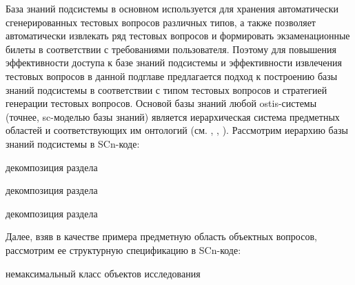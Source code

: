База знаний подсистемы в основном используется для хранения автоматически сгенерированных тестовых вопросов различных типов, а также позволяет автоматически извлекать ряд тестовых вопросов и формировать экзаменационные билеты в соответствии с требованиями пользователя. Поэтому для повышения эффективности доступа к базе знаний подсистемы и эффективности извлечения тестовых вопросов в данной подглаве предлагается подход к построению базы знаний подсистемы в соответствии с типом тестовых вопросов и стратегией генерации тестовых вопросов. Основой базы знаний любой ostis-системы (точнее, sc-моделью базы знаний) является иерархическая система предметных областей и соответствующих им онтологий (см. , , ). Рассмотрим иерархию базы знаний подсистемы в SCn-коде:
\begin{SCn}

\begin{scnreltoset}{декомпозиция раздела}
	
	
	\begin{scnreltoset}{декомпозиция раздела}
	\end{scnreltoset}
	
	
	\begin{scnreltoset}{декомпозиция раздела}
	\end{scnreltoset}
	
\end{scnreltoset}
\end{SCn}

Далее, взяв в качестве примера предметную область объектных вопросов, рассмотрим ее структурную спецификацию в SCn-коде:
\begin{SCn}
\begin{scnhaselementrolelist}{немаксимальный класс объектов исследования}
\end{scnhaselementrolelist}
\end{SCn}

